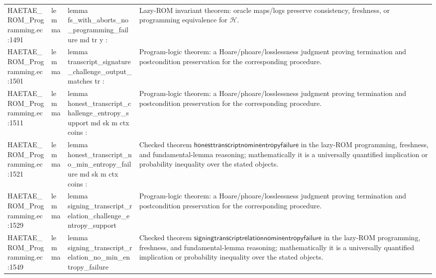 \documentclass[10pt]{article}
\begin{document}
\begin{longtable}{L{0.11\textwidth}L{0.055\textwidth}L{0.385\textwidth}L{0.41\textwidth}}
HAETAE\_\allowbreak{}ROM\_\allowbreak{}Programming.\allowbreak{}ec:\allowbreak{}1491 & lemma & {\ttfamily\scriptsize lemma fs\_\allowbreak{}with\_\allowbreak{}aborts\_\allowbreak{}no\_\allowbreak{}programming\_\allowbreak{}failure md tr y :} & Lazy-ROM invariant theorem: oracle maps/logs preserve consistency, freshness, or programming equivalence for $\mathcal H$. \\
HAETAE\_\allowbreak{}ROM\_\allowbreak{}Programming.\allowbreak{}ec:\allowbreak{}1501 & lemma & {\ttfamily\scriptsize lemma transcript\_\allowbreak{}signature\_\allowbreak{}challenge\_\allowbreak{}output\_\allowbreak{}matches tr :} & Program-logic theorem: a Hoare/phoare/losslessness judgment proving termination and postcondition preservation for the corresponding procedure. \\
HAETAE\_\allowbreak{}ROM\_\allowbreak{}Programming.\allowbreak{}ec:\allowbreak{}1511 & lemma & {\ttfamily\scriptsize lemma honest\_\allowbreak{}transcript\_\allowbreak{}challenge\_\allowbreak{}entropy\_\allowbreak{}support md sk m ctx coins :} & Program-logic theorem: a Hoare/phoare/losslessness judgment proving termination and postcondition preservation for the corresponding procedure. \\
HAETAE\_\allowbreak{}ROM\_\allowbreak{}Programming.\allowbreak{}ec:\allowbreak{}1521 & lemma & {\ttfamily\scriptsize lemma honest\_\allowbreak{}transcript\_\allowbreak{}no\_\allowbreak{}min\_\allowbreak{}entropy\_\allowbreak{}failure md sk m ctx coins :} & Checked theorem $\mathsf{honesttranscriptnominentropyfailure}$ in the lazy-ROM programming, freshness, and fundamental-lemma reasoning; mathematically it is a universally quantified implication or probability inequality over the stated objects. \\
HAETAE\_\allowbreak{}ROM\_\allowbreak{}Programming.\allowbreak{}ec:\allowbreak{}1529 & lemma & {\ttfamily\scriptsize lemma signing\_\allowbreak{}transcript\_\allowbreak{}relation\_\allowbreak{}challenge\_\allowbreak{}entropy\_\allowbreak{}support} & Program-logic theorem: a Hoare/phoare/losslessness judgment proving termination and postcondition preservation for the corresponding procedure. \\
HAETAE\_\allowbreak{}ROM\_\allowbreak{}Programming.\allowbreak{}ec:\allowbreak{}1549 & lemma & {\ttfamily\scriptsize lemma signing\_\allowbreak{}transcript\_\allowbreak{}relation\_\allowbreak{}no\_\allowbreak{}min\_\allowbreak{}entropy\_\allowbreak{}failure} & Checked theorem $\mathsf{signingtranscriptrelationnominentropyfailure}$ in the lazy-ROM programming, freshness, and fundamental-lemma reasoning; mathematically it is a universally quantified implication or probability inequality over the stated objects. \\

\end{longtable}
\end{document}
